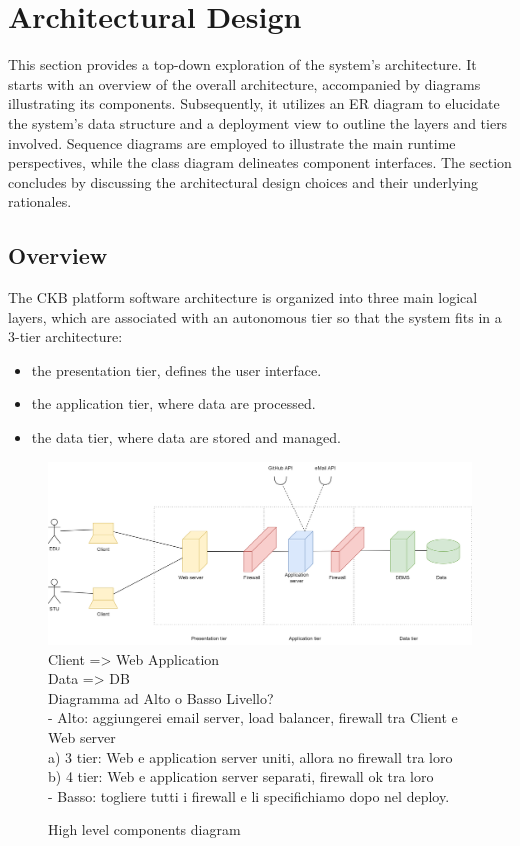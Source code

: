 \chapter{Architectural Design}
This section provides a top-down exploration of the system's architecture. 
It starts with an overview of the overall architecture, accompanied by diagrams illustrating its components. 
Subsequently, it utilizes an ER diagram to elucidate the system's data structure and a deployment view to outline the layers and tiers involved. 
Sequence diagrams are employed to illustrate the main runtime perspectives, while the class diagram delineates component interfaces. 
The section concludes by discussing the architectural design choices and their underlying rationales.

\section{Overview}
The CKB platform software architecture is organized into three main logical layers, which are associated with an autonomous tier so that the system fits in a 3-tier architecture:
\begin{itemize}
    \item the presentation tier, defines the user interface.
    \item the application tier, where data are processed.
    \item the data tier, where data are stored and managed.
\end{itemize}

\begin{figure}[H]
    \centering
    \includegraphics[width=\textwidth]{images/diagrams/high_level_diagram.png}
    {\color{red}
        Client => Web Application \\ 
        Data => DB \\   
        Diagramma ad Alto o Basso Livello? \\
         - Alto: aggiungerei email server, load balancer, firewall tra Client e Web server \\
            a) 3 tier: Web e application server uniti, allora no firewall tra loro\\
            b) 4 tier: Web e application server separati, firewall ok tra loro\\
         - Basso: togliere tutti i firewall e li specifichiamo dopo nel deploy.
    }
    \caption{High level components diagram}
\end{figure}

